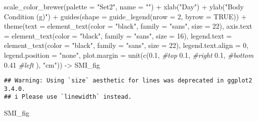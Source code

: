\documentclass[
]{article}
\newenvironment{Shaded}{\begin{snugshade}}{\end{snugshade}}
\newcommand{\AttributeTok}[1]{\textcolor[rgb]{0.77,0.63,0.00}{#1}}
\newcommand{\CommentTok}[1]{\textcolor[rgb]{0.56,0.35,0.01}{\textit{#1}}}
\newcommand{\ConstantTok}[1]{\textcolor[rgb]{0.00,0.00,0.00}{#1}}
\newcommand{\DecValTok}[1]{\textcolor[rgb]{0.00,0.00,0.81}{#1}}
\newcommand{\FloatTok}[1]{\textcolor[rgb]{0.00,0.00,0.81}{#1}}
\newcommand{\FunctionTok}[1]{\textcolor[rgb]{0.00,0.00,0.00}{#1}}
\newcommand{\NormalTok}[1]{#1}
\newcommand{\OtherTok}[1]{\textcolor[rgb]{0.56,0.35,0.01}{#1}}
\newcommand{\SpecialCharTok}[1]{\textcolor[rgb]{0.00,0.00,0.00}{#1}}
\newcommand{\StringTok}[1]{\textcolor[rgb]{0.31,0.60,0.02}{#1}}
\begin{document}
\begin{Shaded}
\begin{Highlighting}[]
  \FunctionTok{scale\_color\_brewer}\NormalTok{(}\AttributeTok{palette =} \StringTok{"Set2"}\NormalTok{, }\AttributeTok{name =} \StringTok{""}\NormalTok{) }\SpecialCharTok{+}
  \FunctionTok{xlab}\NormalTok{(}\StringTok{"Day"}\NormalTok{) }\SpecialCharTok{+} 
  \FunctionTok{ylab}\NormalTok{(}\StringTok{"Body Condition (g)"}\NormalTok{) }\SpecialCharTok{+} 
  \FunctionTok{guides}\NormalTok{(}\AttributeTok{shape =} \FunctionTok{guide\_legend}\NormalTok{(}\AttributeTok{nrow =} \DecValTok{2}\NormalTok{, }\AttributeTok{byrow =} \ConstantTok{TRUE}\NormalTok{)) }\SpecialCharTok{+}
  \FunctionTok{theme}\NormalTok{(}\AttributeTok{text =} \FunctionTok{element\_text}\NormalTok{(}\AttributeTok{color =} \StringTok{"black"}\NormalTok{, }
                            \AttributeTok{family =} \StringTok{"sans"}\NormalTok{, }
                            \AttributeTok{size =} \DecValTok{22}\NormalTok{),}
        \AttributeTok{axis.text =} \FunctionTok{element\_text}\NormalTok{(}\AttributeTok{color =} \StringTok{"black"}\NormalTok{, }
                                 \AttributeTok{family =} \StringTok{"sans"}\NormalTok{, }
                                 \AttributeTok{size =} \DecValTok{16}\NormalTok{),}
        \AttributeTok{legend.text =} \FunctionTok{element\_text}\NormalTok{(}\AttributeTok{color =} \StringTok{"black"}\NormalTok{, }
                                 \AttributeTok{family =} \StringTok{"sans"}\NormalTok{, }
                                 \AttributeTok{size =} \DecValTok{22}\NormalTok{),}
        \AttributeTok{legend.text.align =} \DecValTok{0}\NormalTok{,}
        \AttributeTok{legend.position =} \StringTok{"none"}\NormalTok{,}
        \AttributeTok{plot.margin =} \FunctionTok{unit}\NormalTok{(}\FunctionTok{c}\NormalTok{(}\FloatTok{0.1}\NormalTok{, }\CommentTok{\#top}
                             \FloatTok{0.1}\NormalTok{, }\CommentTok{\#right}
                             \FloatTok{0.1}\NormalTok{, }\CommentTok{\#bottom}
                             \FloatTok{0.41} \CommentTok{\#left}
\NormalTok{                             ), }\StringTok{"cm"}\NormalTok{)) }\OtherTok{{-}\textgreater{}}\NormalTok{ SMI\_fig}
\end{Highlighting}
\end{Shaded}

\begin{verbatim}
## Warning: Using `size` aesthetic for lines was deprecated in ggplot2 3.4.0.
## i Please use `linewidth` instead.
\end{verbatim}

\begin{Shaded}
\begin{Highlighting}[]
\NormalTok{SMI\_fig}
\end{Highlighting}
\end{Shaded}
\end{document}
